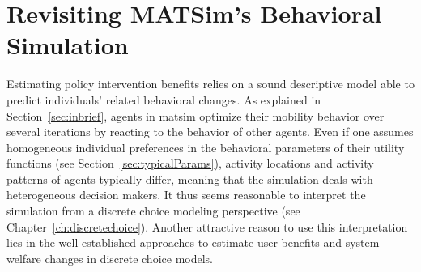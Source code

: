 \section{Revisiting MATSim's Behavioral Simulation}
\label{ch:economicEval:describingBehavior}
%
%
Estimating policy intervention benefits relies on a sound descriptive model able to predict individuals' related behavioral changes.
%
%
As explained in Section~\ref{sec:inbrief}, agents in \gls{matsim} optimize their mobility behavior over several iterations by reacting to the behavior of other agents. Even if one assumes homogeneous individual preferences in the behavioral parameters of their utility functions (see Section~\ref{sec:typicalParams}), activity locations and activity patterns of agents typically differ, meaning that the simulation deals with heterogeneous decision makers. It thus seems reasonable to interpret the simulation from a discrete choice modeling perspective (see Chapter~\ref{ch:discretechoice}). Another attractive reason to use this interpretation lies in the well-established approaches to estimate user benefits and system welfare changes in   discrete choice models. 

